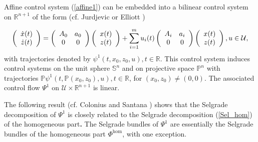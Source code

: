 \documentclass[preprint,12pt]{elsarticle}
\begin{document}
Affine control system (\ref{affine1}) can be embedded into a bilinear control
system on $\mathbb{R}^{n+1}$ of the form (cf. Jurdjevic \cite{Jurd84} or
Elliott \cite[Subsection 3.8.1]{Elliott})%

\begin{equation}
\left(
\begin{array}
[c]{c}%
\dot{x}(t)\\
\dot{z}(t)
\end{array}
\right)  =\left(
\begin{array}
[c]{cc}%
A_{0} & a_{0}\\
0 & 0
\end{array}
\right)  \left(
\begin{array}
[c]{c}%
x(t)\\
z(t)
\end{array}
\right)  +\sum_{i=1}^{m}u_{i}(t)\left(
\begin{array}
[c]{cc}%
A_{i} & a_{i}\\
0 & 0
\end{array}
\right)  \left(
\begin{array}
[c]{c}%
x(t)\\
z(t)
\end{array}
\right)  ,u\in\mathcal{U}, \label{hom_d+1}%
\end{equation}
with trajectories denoted by $\psi^{1}(t,x_{0},z_{0},u),t\in\mathbb{R}$. This
control system induces control systems on the unit sphere $\mathbb{S}^{n}$ and
on projective space $\mathbb{P}^{n}$ with trajectories $\mathbb{P}\psi
^{1}(t,\mathbb{P}(x_{0},z_{0}),u),t\in\mathbb{R}$, for $(x_{0},z_{0}%
)\not =(0,0)$. The associated control flow $\Psi^{1}$ on $\mathcal{U}%
\times\mathbb{R}^{n+1}$ is linear.

The following result (cf. Colonius and Santana \cite[Corollary 32]{ColS24a})
shows that the Selgrade decomposition of $\Psi^{1}$ is closely related to the
Selgrade decomposition (\ref{Sel_hom}) of the homogeneous part\textbf{.} The
Selgrade bundles of $\Psi^{1}$ are essentially the Selgrade bundles of the
homogeneous part $\Phi^{\hom}$, with one exception.
\end{document}
